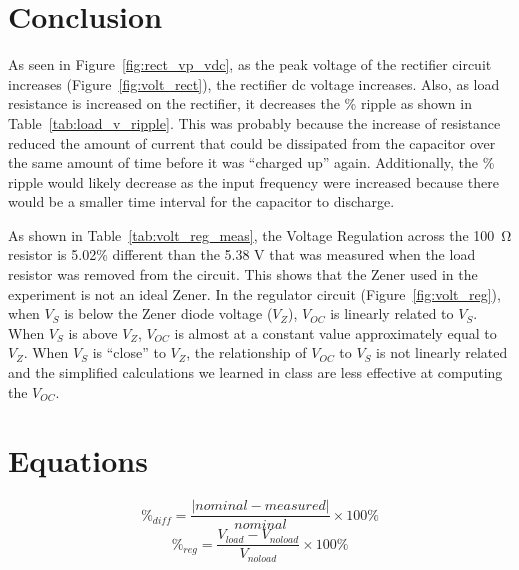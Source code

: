 \documentclass{article}
\begin{document}
\section{Conclusion}
\label{sec:conclusion}

As seen in Figure~\ref{fig:rect_vp_vdc}, as the peak voltage of the rectifier circuit increases (Figure~\ref{fig:volt_rect}), the rectifier dc voltage increases. Also, as load resistance is increased on the rectifier, it decreases the \% ripple as shown in Table~\ref{tab:load_v_ripple}. This was probably because the increase of resistance reduced the amount of current that could be dissipated from the capacitor over the same amount of time before it was “charged up” again. Additionally, the \% ripple would likely decrease as the input frequency were increased because there would be a smaller time interval for the capacitor to discharge. 

As shown in Table~\ref{tab:volt_reg_meas}, the Voltage Regulation across the \SI{100}{\ohm} resistor is 5.02\% different than the 5.38 V that was measured when the load resistor was removed from the circuit. This shows that the Zener used in the experiment is not an ideal Zener. In the regulator circuit (Figure~\ref{fig:volt_reg}), when $V_S$ is below the Zener diode voltage ($V_Z$), $V_{OC}$ is linearly related to $V_S$. When $V_S$ is above $V_Z$, $V_{OC}$ is almost at a constant value approximately equal to $V_Z$. When $V_S$ is “close” to $V_Z$, the relationship of $V_{OC}$ to $V_S$ is not linearly related and the simplified calculations we learned in class are less effective at computing the $V_{OC}$. 
\section{Equations}
\label{sec:equations}

%
\begin{equation}
  \label{eq:percent_diff}
  \%_{diff} = \frac{|nominal - measured|}{nominal}\times 100\%
\end{equation}
%
\begin{equation}
  \label{eq:volt_reg}
  \%_{reg} = \frac{V_{load} - V_{no load}}{V_{no load}}\times 100\%
\end{equation}
\end{document}
